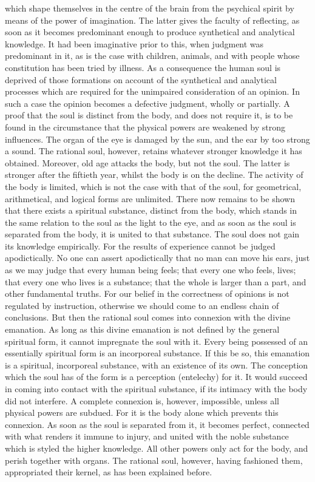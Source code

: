 \documentclass[12pt]{article}
\begin{document}
which shape themselves in the centre of the brain from the psychical spirit by means of the power of imagination. The latter gives the faculty of reflecting, as soon as it becomes predominant enough to produce synthetical and analytical knowledge. It had been imaginative prior to this, when judgment was predominant in it, as is the case with children, animals, and with people whose constitution has been tried by illness. As a consequence the human soul is deprived of those formations on account of the synthetical and analytical processes which are required for the unimpaired consideration of an opinion. In such a case the opinion becomes a defective judgment, wholly or partially. A proof that the soul is distinct from the body, and does not require it, is to be found in the circumstance that the physical powers are weakened by strong influences. The organ of the eye is damaged by the sun, and the ear by too strong a sound. The rational soul, however, retains whatever stronger knowledge it has obtained. Moreover, old age attacks the body, but not the soul. The latter is stronger after the fiftieth year, whilst the body is on the decline. The activity of the body is limited, which is not the case with that of the soul, for geometrical, arithmetical, and logical forms are unlimited. There now remains to be shown that there exists a spiritual substance, distinct from the body, which stands in the same relation to the soul as the light to the eye, and as soon as the soul is separated from the body, it is united to that substance. The soul does not gain its knowledge empirically. For the results of experience cannot be judged apodictically. No one can assert apodictically that no man can move his ears, just as we may judge that every human being feels; that every one who feels, lives; that every one who lives is a substance; that the whole is larger than a part, and other fundamental truths. For our belief in the correctness of opinions is not regulated by instruction, otherwise we should come to an endless chain of conclusions. But then the rational soul comes into connexion with the divine emanation. As long as this divine emanation is not defined by the general spiritual form, it cannot impregnate the soul with it. Every being possessed of an essentially spiritual form is an incorporeal substance. If this be so, this emanation is a spiritual, incorporeal substance, with an existence of its own. The conception which the soul has of the form is a perception (entelechy) for it. It would succeed in coming into contact with the spiritual substance, if its intimacy with the body did not interfere. A complete connexion is, however, impossible, unless all physical powers are subdued. For it is the body alone which prevents this connexion. As soon as the soul is separated from it, it becomes perfect, connected with what renders it immune to injury, and united with the noble substance which is styled the higher knowledge. All other powers only act for the body, and perish together with organs. The rational soul, however, having fashioned them, appropriated their kernel, as has been explained before.
\end{document}
